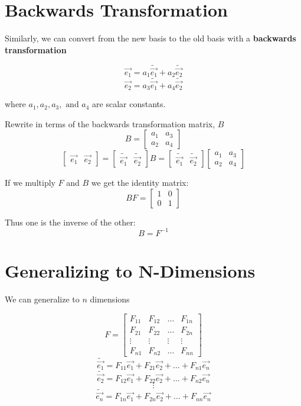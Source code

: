 \documentclass{report}
\begin{document}
\section{Backwards Transformation}
Similarly, we can convert from the new basis to the old basis with a \textbf{backwards transformation}

$$ \vec{e_1} = a_1 \tilde{\vec{e_1}} + a_2 \tilde{\vec{e_2}} $$
$$ \vec{e_2} = a_3 \tilde{\vec{e_1}} + a_4 \tilde{\vec{e_2}} $$


where $a_1, a_2, a_3,\text{ and } a_4$ are scalar constants.

Rewrite in terms of the backwards transformation matrix, $B$
$$ B = \begin{bmatrix} a_1 & a_3 \\ a_2 & a_4 \end{bmatrix}  $$ 
$$ \begin{bmatrix} \vec{e_1} & \vec{e_2} \end{bmatrix} = \begin{bmatrix} \tilde{\vec{e_1}} & \tilde{\vec{e_2}} \end{bmatrix} B = \begin{bmatrix} \tilde{\vec{e_1}} & \tilde{\vec{e_2}} \end{bmatrix} \begin{bmatrix} a_1 & a_3 \\ a_2 & a_4 \end{bmatrix} $$ 

If we multiply $F$ and $B$ we get the identity matrix:
$$ BF = \begin{bmatrix} 1 & 0 \\ 0 & 1 \end{bmatrix}  $$ 

Thus one is the inverse of the other:
$$ B = F^{-1} $$ 

\section{Generalizing to N-Dimensions}
We can generalize to $n$ dimensions 

$$ F = \begin{bmatrix} F_{11} & F_{12} & \ldots & F_{1n} \\ F_{21} & F_{22} & \ldots & F_{2n} \\ \vdots & \vdots & \vdots & \vdots \\ F_{n1} & F_{n2} & \ldots & F_{nn} \end{bmatrix}$$ 
$$ \tilde{\vec{e_1}} = F_{11}\vec{e_1} + F_{21}\vec{e_2} + \ldots + F_{n1} \vec{e_n} $$ 
$$ \tilde{\vec{e_2}} = F_{12}\vec{e_1} + F_{22}\vec{e_2} + \ldots + F_{n2} \vec{e_n} $$ 
$$ \vdots $$ 
$$ \tilde{\vec{e_n}} = F_{1n} \vec{e_1} + F_{2n}\vec{e_2} + \ldots + F_{nn} \vec{e_n} $$ 
\end{document}
